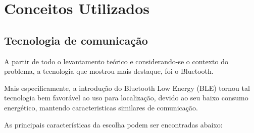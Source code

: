 \chapter{Conceitos Utilizados}

\section{Tecnologia de comunicação}
A partir de todo o levantamento teórico e considerando-se o contexto do problema, a tecnologia que mostrou mais destaque, foi o Bluetooth. 

Mais especificamente, a introdução do Bluetooth Low Energy (BLE) tornou tal tecnologia bem favorável ao uso para localização, devido ao seu baixo consumo energético, mantendo caracteristicas similares de comunicação.

As principais características da escolha podem ser encontradas abaixo:

